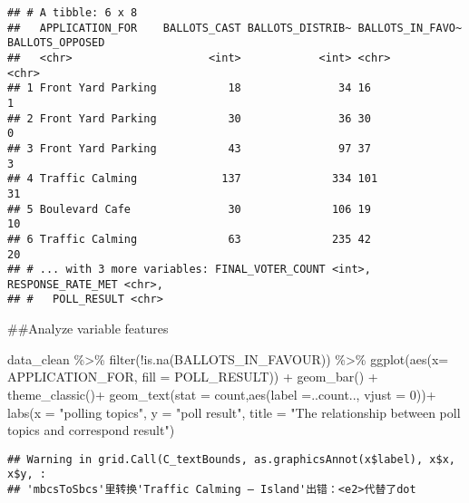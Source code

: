 \documentclass[
]{article}
\newenvironment{Shaded}{\begin{snugshade}}{\end{snugshade}}
\newcommand{\AttributeTok}[1]{\textcolor[rgb]{0.77,0.63,0.00}{#1}}
\newcommand{\DecValTok}[1]{\textcolor[rgb]{0.00,0.00,0.81}{#1}}
\newcommand{\FunctionTok}[1]{\textcolor[rgb]{0.00,0.00,0.00}{#1}}
\newcommand{\NormalTok}[1]{#1}
\newcommand{\SpecialCharTok}[1]{\textcolor[rgb]{0.00,0.00,0.00}{#1}}
\newcommand{\StringTok}[1]{\textcolor[rgb]{0.31,0.60,0.02}{#1}}
\begin{document}
\begin{verbatim}
## # A tibble: 6 x 8
##   APPLICATION_FOR    BALLOTS_CAST BALLOTS_DISTRIB~ BALLOTS_IN_FAVO~ BALLOTS_OPPOSED
##   <chr>                     <int>            <int> <chr>            <chr>          
## 1 Front Yard Parking           18               34 16               1              
## 2 Front Yard Parking           30               36 30               0              
## 3 Front Yard Parking           43               97 37               3              
## 4 Traffic Calming             137              334 101              31             
## 5 Boulevard Cafe               30              106 19               10             
## 6 Traffic Calming              63              235 42               20             
## # ... with 3 more variables: FINAL_VOTER_COUNT <int>, RESPONSE_RATE_MET <chr>,
## #   POLL_RESULT <chr>
\end{verbatim}

\#\#Analyze variable features

\begin{Shaded}
\begin{Highlighting}[]
\NormalTok{data\_clean }\SpecialCharTok{\%\textgreater{}\%} \FunctionTok{filter}\NormalTok{(}\SpecialCharTok{!}\FunctionTok{is.na}\NormalTok{(BALLOTS\_IN\_FAVOUR)) }\SpecialCharTok{\%\textgreater{}\%}
\FunctionTok{ggplot}\NormalTok{(}\FunctionTok{aes}\NormalTok{(}\AttributeTok{x=}\NormalTok{ APPLICATION\_FOR, }\AttributeTok{fill =}\NormalTok{ POLL\_RESULT)) }\SpecialCharTok{+} \FunctionTok{geom\_bar}\NormalTok{() }\SpecialCharTok{+} \FunctionTok{theme\_classic}\NormalTok{()}\SpecialCharTok{+} \FunctionTok{geom\_text}\NormalTok{(}\AttributeTok{stat =} \StringTok{\textquotesingle{}count\textquotesingle{}}\NormalTok{,}\FunctionTok{aes}\NormalTok{(}\AttributeTok{label =}\NormalTok{..count.., }\AttributeTok{vjust =} \DecValTok{0}\NormalTok{))}\SpecialCharTok{+}
\FunctionTok{labs}\NormalTok{(}\AttributeTok{x =} \StringTok{"polling topics"}\NormalTok{, }\AttributeTok{y =} \StringTok{"poll result"}\NormalTok{, }\AttributeTok{title =} \StringTok{"The relationship between poll topics and correspond result"}\NormalTok{)}
\end{Highlighting}
\end{Shaded}

\begin{verbatim}
## Warning in grid.Call(C_textBounds, as.graphicsAnnot(x$label), x$x, x$y, :
## 'mbcsToSbcs'里转换'Traffic Calming – Island'出错：<e2>代替了dot
\end{verbatim}
\end{document}

